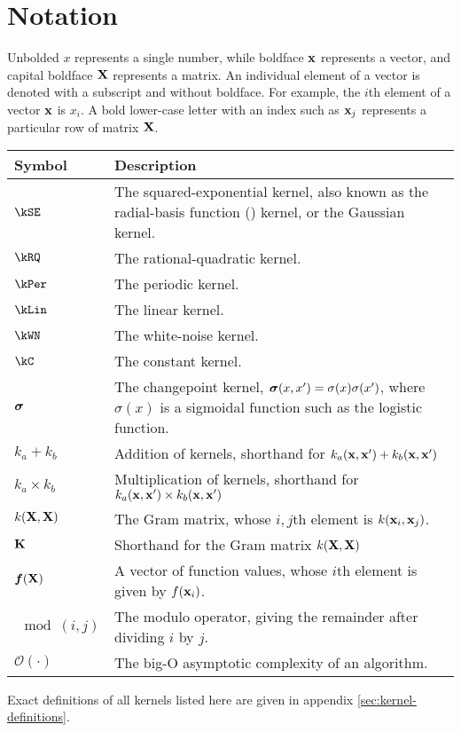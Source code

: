 
\inbpdocument

\chapter*{Notation}
\label{ch:notation}


Unbolded $x$ represents a single number, while boldface ${\bf{x}}$ represents a vector, and capital boldface $\mathbf{X}$ represents a matrix.
An individual element of a vector is denoted with a subscript and without boldface.
For example, the $i$th element of a vector ${\bf{x}}$ is $x_i$.
A bold lower-case letter with an index such as ${\bf{x}}_j$ represents a particular row of matrix $\mathbf{X}$.

\vspace{1cm}

\begin{tabular}{lm{12cm}}
Symbol \quad     & Description \\
\hline
$\kSE$ & The squared-exponential kernel, also known as the radial-basis function (\RBF{}) kernel, or the Gaussian kernel. \\
$\kRQ$ & The rational-quadratic kernel. \\
$\kPer$ & The periodic kernel. \\
$\kLin$ & The linear kernel. \\
$\kWN$ & The white-noise kernel. \\
$\kC$ & The constant kernel. \\
${\boldsymbol{\sigma}}$ & The changepoint kernel, ${\boldsymbol{\sigma}}(x, x') = \sigma(x) \sigma(x')$, where $\sigma(x)$ is a sigmoidal function such as the logistic function. \\
$k_a + k_b$ & Addition of kernels, shorthand for $k_a({\bf{x}}, {\bf{x}}') + k_b({\bf{x}}, {\bf{x}}')$ \\
$k_a \times k_b$& Multiplication of kernels, shorthand for $k_a({\bf{x}}, {\bf{x}}') \times k_b({\bf{x}}, {\bf{x}}')$ \\
$k(\mathbf{X}, \mathbf{X})$ & The Gram matrix, whose $i,j$th element is $k({\bf{x}}_i, {\bf{x}}_j)$. \\
$\mathbf{K}$ & Shorthand for the Gram matrix $k(\mathbf{X}, \mathbf{X})$ \\
$\boldsymbol{f}(\mathbf{X})$ & A vector of function values, whose $i$th element is given by $f({\bf{x}}_i)$. \\
$\mod(i,j)$ & The modulo operator, giving the remainder after dividing $i$ by $j$. \\
$\mathcal{O}(\cdot)$ & The big-O asymptotic complexity of an algorithm.
\end{tabular}

\vspace{1cm}
Exact definitions of all kernels listed here are given in appendix \ref{sec:kernel-definitions}.


\outbpdocument{
}


